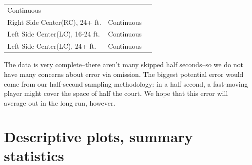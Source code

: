 \documentclass[]{article}
\begin{document}
\begin{longtable}[]{@{}lll@{}}
\begin{minipage}[t]{0.12\columnwidth}
Continuous\strut
\end{minipage} & \begin{minipage}[t]{0.47\columnwidth}\raggedright
\strut
\end{minipage}\tabularnewline
\begin{minipage}[t]{0.32\columnwidth}\raggedright
Right Side Center(RC), 24+ ft.\strut
\end{minipage} & \begin{minipage}[t]{0.12\columnwidth}\raggedright
Continuous\strut
\end{minipage} & \begin{minipage}[t]{0.47\columnwidth}\raggedright
\strut
\end{minipage}\tabularnewline
\begin{minipage}[t]{0.32\columnwidth}\raggedright
Left Side Center(LC), 16-24 ft.\strut
\end{minipage} & \begin{minipage}[t]{0.12\columnwidth}\raggedright
Continuous\strut
\end{minipage} & \begin{minipage}[t]{0.47\columnwidth}\raggedright
\strut
\end{minipage}\tabularnewline
\begin{minipage}[t]{0.32\columnwidth}\raggedright
Left Side Center(LC), 24+ ft.\strut
\end{minipage} & \begin{minipage}[t]{0.12\columnwidth}\raggedright
Continuous\strut
\end{minipage} & \begin{minipage}[t]{0.47\columnwidth}\raggedright
\strut
\end{minipage}\tabularnewline
\bottomrule
\end{longtable}

The data is very complete--there aren't many skipped half seconds--so we
do not have many concerns about error via omission. The biggest
potential error would come from our half-second sampling methodology: in
a half second, a fast-moving player might cover the space of half the
court. We hope that this error will average out in the long run,
however.

\hypertarget{descriptive-plots-summary-statistics}{%
\section{Descriptive plots, summary
statistics}\label{descriptive-plots-summary-statistics}}
\end{document}
